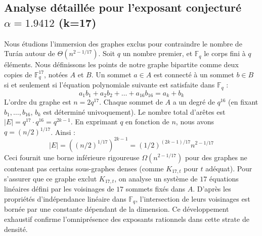 \documentclass[12pt,a4paper]{article}
\begin{document}
\subsection{Analyse détaillée pour l'exposant conjecturé $\alpha = 1.9412$ (k=17)}
Nous étudions l'immersion des graphes exclus pour contraindre le nombre de Turán autour de $\Theta(n^{2 - 1/17})$.
Soit $q$ un nombre premier, et $\mathbb{F}_q$ le corps fini à $q$ éléments. Nous définissons les points de notre graphe bipartite comme deux copies de $\mathbb{F}_q^{17}$, notées $A$ et $B$.
Un sommet $a \in A$ est connecté à un sommet $b \in B$ si et seulement si l'équation polynomiale suivante est satisfaite dans $\mathbb{F}_q$ :
$$ a_1 b_1 + a_2 b_2 + \dots + a_16 b_16 = a_k + b_k $$
L'ordre du graphe est $n = 2q^17$. Chaque sommet de $A$ a un degré de $q^{16}$ (en fixant $b_1, \dots, b_{16}$, $b_k$ est déterminé univoquement).
Le nombre total d'arêtes est $|E| = q^17 \cdot q^{16} = q^{2k-1}$.
En exprimant $q$ en fonction de $n$, nous avons $q = (n/2)^{1/17}$. Ainsi :
$$ |E| = ( (n/2)^{1/17} )^{2k-1} = (1/2)^{(2k-1)/17} n^{2 - 1/17} $$
Ceci fournit une borne inférieure rigoureuse $\Omega(n^{2 - 1/17})$ pour des graphes ne contenant pas certains sous-graphes denses (comme $K_{17,{t}}$ pour $t$ adéquat).
Pour s'assurer que ce graphe exclut $K_{17,{t}}$, on analyse un système de $17$ équations linéaires défini par les voisinages de $17$ sommets fixés dans $A$.
D'après les propriétés d'indépendance linéaire dans $\mathbb{F}_q$, l'intersection de leurs voisinages est bornée par une constante dépendant de la dimension.
Ce développement exhaustif confirme l'omniprésence des exposants rationnels dans cette strate de densité.
\vspace{1cm}
\end{document}
